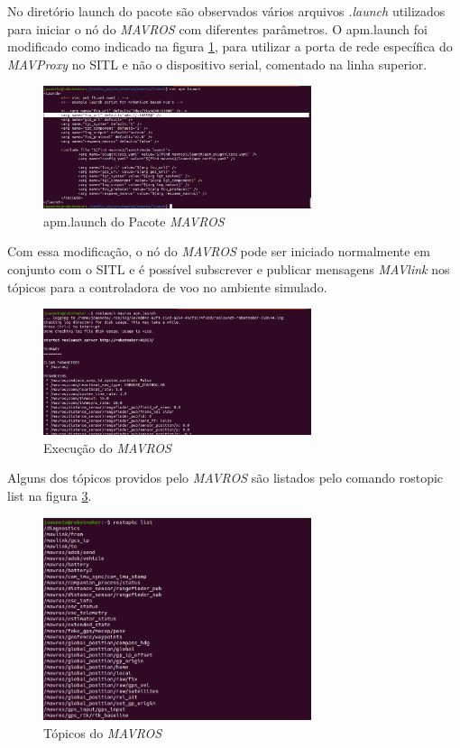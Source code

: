\documentclass[12pt,a4paper,oneside]{book}
\begin{document}
No diretório launch do pacote são observados vários arquivos \textit{.launch} utilizados para iniciar o nó do \textit{MAVROS} com diferentes parâmetros. O apm.launch foi modificado como indicado na figura \ref{fig:mavros_launch.png.0}, para utilizar a porta de rede específica do \textit{MAVProxy} no SITL e não o dispositivo serial, comentado na linha superior.
%
\begin{figure}[H]
  \centering
  \includegraphics[width=0.7\textwidth]{Images/Desenvolvimento/mavros_launch.png}
  \caption{apm.launch do Pacote \textit{MAVROS}}
  \label{fig:mavros_launch.png.0}
\end{figure}
%
Com essa modificação, o nó do \textit{MAVROS} pode ser iniciado normalmente em conjunto com o SITL e é possível subscrever e publicar mensagens \textit{MAVlink} nos tópicos para a controladora de voo no ambiente simulado. 
%
\begin{figure}[H]
  \centering
  \includegraphics[width=0.7\textwidth]{Images/Desenvolvimento/mavros_execution.png}
  \caption{Execução do \textit{MAVROS}}
  \label{fig:mavros_execution.png.0}
\end{figure}
%
Alguns dos tópicos providos pelo \textit{MAVROS} são listados pelo comando rostopic list na figura \ref{fig:mavros_rostopic_list.png.0}. 
%
\begin{figure}[H]
  \centering
  \includegraphics[width=0.7\textwidth]{Images/Desenvolvimento/mavros_rostopic_list.png}
  \caption{Tópicos do \textit{MAVROS}}
  \label{fig:mavros_rostopic_list.png.0}
\end{figure}
\end{document}
